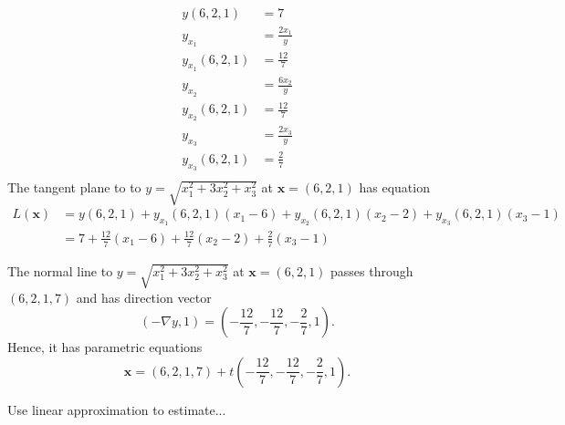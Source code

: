 \documentclass{exam}
\begin{document}
\begin{questions}
\begin{parts}
        \begin{solution}
            \begin{align*}
                y(6,2,1) &= 7\\
                y_{x_1} &= \frac{2x_1}{y}\\
                y_{x_1}(6,2,1) &= \frac{12}{7}\\
                y_{x_2} &= \frac{6x_2}{y}\\
                y_{x_2}(6,2,1) &= \frac{12}{7}\\
                y_{x_3} &= \frac{2x_3}{y}\\
                y_{x_3}(6,2,1) &= \frac{2}{7}\\
            \end{align*}
            The tangent plane to to $y=\sqrt{x_1^2 + 3x_2^2 + x_3^2}$
            at $\mathbf{x}=(6, 2, 1)$ has equation
            \begin{align*}
                L(\mathbf{x}) &= y(6,2,1) + y_{x_1}(6,2,1)(x_1-6)
                + y_{x_2}(6,2,1)(x_2-2) + y_{x_3}(6,2,1)(x_3-1)\\
                &= 7 + \frac{12}7(x_1-6) + \frac{12}7(x_2-2) + \frac27(x_3-1)
            \end{align*}

            The normal line to $y=\sqrt{x_1^2 + 3x_2^2 + x_3^2}$
            at $\mathbf{x}=(6, 2, 1)$
            passes through $(6,2,1,7)$ and has direction vector
            \[
                (-\nabla y, 1) = \left(-\frac{12}7,-\frac{12}{7},-\frac27,1\right).
            \]
            Hence, it has parametric equations
            \[
                \mathbf{x} = (6,2,1,7) + t\left(-\frac{12}7,-\frac{12}{7},-\frac27,1\right).
            \]
        \end{solution}
    \end{parts}

    \question Use linear approximation to estimate...
\end{questions}
\end{document}
